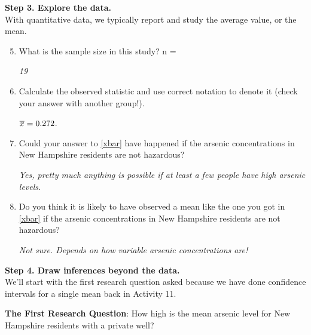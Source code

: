 {\bf Step 3. Explore the data. }\\
With quantitative data, we typically report and study the average value, or the mean.
\begin{enumerate}
\setcounter{enumi}{4}
\item  What is the sample size in this study?  n = \begin{key}
  {\it 19}
\end{key}

\item \label{xbar} Calculate the observed statistic and use correct notation to
  denote it (check your answer with another  group!).
\begin{students}
  \vspace{1cm}
\end{students}
\begin{key}
   $ \overline{x} =   0.272$. 
\end{key}
\item  Could your answer to \ref{xbar} have happened if the arsenic
  concentrations in New Hampshire residents are not hazardous? 
\begin{students}
  \vspace{1cm}
\end{students}
\begin{key}
   {\it Yes, pretty much anything is possible if at least a few people
     have high arsenic levels.}  
\end{key}
\item  Do you think it is likely to have observed a mean like the one
  you got in \ref{xbar} if the arsenic concentrations in New Hampshire
  residents are not hazardous?
  
\begin{students}
  \vspace{1cm}
\end{students}
\begin{key}
   {\it Not sure.  Depends on how variable arsenic concentrations are!
}
\end{key}
\end{enumerate}


{\bf Step 4. Draw inferences beyond the data. }\\
We'll start with the first research question asked because we have
done confidence intervals for a single mean back in Activity 11. 

{\bf The First Research Question}: How high is the mean arsenic level
for New Hampshire residents with a private well? 

